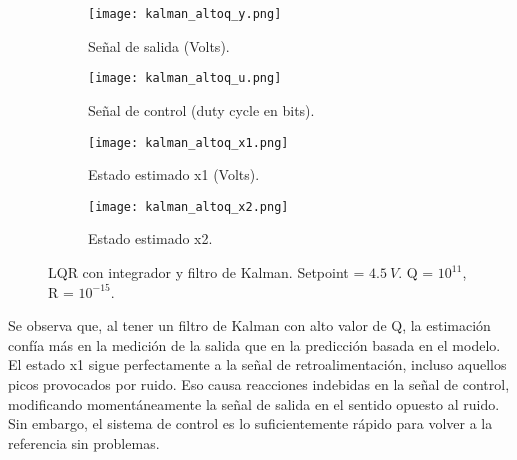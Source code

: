 \begin{figure}[H]
    \centering

    \begin{subfigure}[b]{0.49\textwidth}
        \centering
        \texttt{[image: kalman\_altoq\_y.png]}
        \caption{Señal de salida (Volts).}
        \label{fig:kalman_altoq_y}
    \end{subfigure}
    \begin{subfigure}[b]{0.49\textwidth}
        \centering
        \texttt{[image: kalman\_altoq\_u.png]}
        \caption{Señal de control (duty cycle en bits).}
        \label{fig:kalman_altoq_u}
    \end{subfigure}

    \begin{subfigure}[b]{0.49\textwidth}
        \centering
        \texttt{[image: kalman\_altoq\_x1.png]}
        \caption{Estado estimado x1 (Volts).}
        \label{fig:kalman_altoq_x1}
    \end{subfigure}
    \begin{subfigure}[b]{0.49\textwidth}
        \centering
        \texttt{[image: kalman\_altoq\_x2.png]}
        \caption{Estado estimado x2.}
        \label{fig:kalman_altoq_x2}
    \end{subfigure}

    \vspace{-0.25cm}
    \caption{LQR con integrador y filtro de Kalman. Setpoint = $4.5\ V$. Q = $10^{11}$, R = $10^{-15}$.}
    \label{fig:kalman_altoq}
\end{figure}
\vspace{-0.5cm}

Se observa que, al tener un filtro de Kalman con alto valor de Q, la estimación confía más en la medición de la salida que en la predicción
basada en el modelo. El estado x1 sigue perfectamente a la señal de retroalimentación, incluso aquellos picos provocados por ruido.
Eso causa reacciones indebidas en la señal de control, modificando momentáneamente la señal de salida en el sentido opuesto al ruido.
Sin embargo, el sistema de control es lo suficientemente rápido para volver a la referencia sin problemas.

